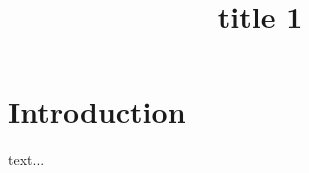 \documentclass[main]{subfiles} %
\begin{document}
\title{title 1}

\maketitle

\section{Introduction}

text...
\end{document}
